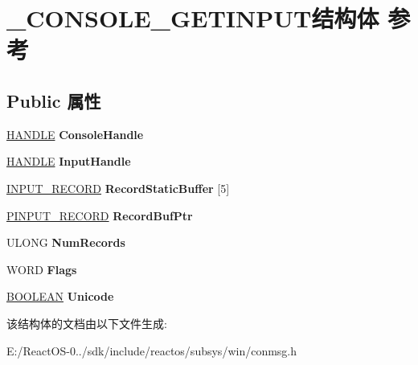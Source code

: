 \hypertarget{struct___c_o_n_s_o_l_e___g_e_t_i_n_p_u_t}{}\section{\+\_\+\+C\+O\+N\+S\+O\+L\+E\+\_\+\+G\+E\+T\+I\+N\+P\+U\+T结构体 参考}
\label{struct___c_o_n_s_o_l_e___g_e_t_i_n_p_u_t}
\subsection*{Public 属性}
\begin{DoxyCompactItemize}
\item 
\mbox{\label{struct___c_o_n_s_o_l_e___g_e_t_i_n_p_u_t_a4f92539f0434b12add141f57722a8d64}} 
\hyperlink{interfacevoid}{H\+A\+N\+D\+LE} {\bfseries Console\+Handle}
\item 
\mbox{\label{struct___c_o_n_s_o_l_e___g_e_t_i_n_p_u_t_a81305a6a05052083e671fd8bdc4c590a}} 
\hyperlink{interfacevoid}{H\+A\+N\+D\+LE} {\bfseries Input\+Handle}
\item 
\mbox{\label{struct___c_o_n_s_o_l_e___g_e_t_i_n_p_u_t_aa6d54969a3b2706d5e2601d05f125a10}} 
\hyperlink{struct___i_n_p_u_t___r_e_c_o_r_d}{I\+N\+P\+U\+T\+\_\+\+R\+E\+C\+O\+RD} {\bfseries Record\+Static\+Buffer} \mbox{[}5\mbox{]}
\item 
\mbox{\label{struct___c_o_n_s_o_l_e___g_e_t_i_n_p_u_t_a408101c363ae88904939ce28038e6cd2}} 
\hyperlink{struct___i_n_p_u_t___r_e_c_o_r_d}{P\+I\+N\+P\+U\+T\+\_\+\+R\+E\+C\+O\+RD} {\bfseries Record\+Buf\+Ptr}
\item 
\mbox{\label{struct___c_o_n_s_o_l_e___g_e_t_i_n_p_u_t_a1e6e736f23749993f6ea1a72f5d52cd9}} 
U\+L\+O\+NG {\bfseries Num\+Records}
\item 
\mbox{\label{struct___c_o_n_s_o_l_e___g_e_t_i_n_p_u_t_a9cc396669d11b79b1bbbdc2c6187be6c}} 
W\+O\+RD {\bfseries Flags}
\item 
\mbox{\label{struct___c_o_n_s_o_l_e___g_e_t_i_n_p_u_t_a545ab47c52a1fc7bb0f6c729b0801464}} 
\hyperlink{_processor_bind_8h_a112e3146cb38b6ee95e64d85842e380a}{B\+O\+O\+L\+E\+AN} {\bfseries Unicode}
\end{DoxyCompactItemize}


该结构体的文档由以下文件生成\+:\begin{DoxyCompactItemize}
\item 
E\+:/\+React\+O\+S-\/0../sdk/include/reactos/subsys/win/conmsg.\+h\end{DoxyCompactItemize}
